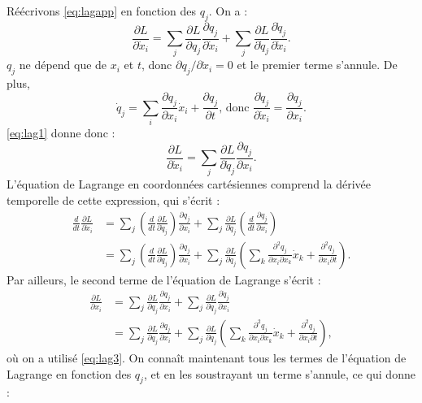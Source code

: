 Réécrivons \ref{eq:lagapp} en fonction des ${q_j}$. On a : 
\begin{equation}
\label{eq:lag1}
\frac{\partial L}{\partial \dot{x}_i} = \sum_j \frac{\partial L}{\partial q_j} \frac{\partial q_j}{\partial \dot{x}_i}+ \sum_j\frac{\partial L}{\partial \dot{q}_j}\frac{\partial \dot{q}_j}{\partial \dot{x}_i}.
\end{equation}
$q_j$ ne dépend que de $x_i$ et $t$, donc ${\partial q_j}/{\partial \dot{x}_i}=0$ et le premier terme s'annule. De plus,
\begin{equation}
\dot{q}_j = \sum_i \frac{\partial q_j}{\partial x_i}\dot{x}_i+\frac{\partial q_j}{\partial t}\text{,  donc  }
\frac{\partial \dot{q}_j}{\partial \dot{x}_i}=\frac{\partial q_j}{\partial x_i}.
\label{eq:lag3}
\end{equation}
\ref{eq:lag1} donne donc :
\begin{equation}
\label{eq:lag2}
\frac{\partial L}{\partial \dot{x}_i} = \sum_j\frac{\partial L}{\partial \dot{q}_j}\frac{\partial q_j}{\partial x_i}.
\end{equation}
L'équation de Lagrange en coordonnées cartésiennes comprend la dérivée temporelle de cette expression, qui s'écrit :
\begin{align}
\frac{d}{dt}\frac{\partial L}{\partial \dot{x}_i} &= 
\sum_j\left(\frac{d}{dt}\frac{\partial L}{\partial \dot{q}_j}\right)\frac{\partial q_j}{\partial x_i}+
\sum_j\frac{\partial L}{\partial \dot{q}_j}\left(\frac{d}{dt}\frac{\partial q_j}{\partial x_i}\right) \\
&=\sum_j \left(\frac{d}{dt}\frac{\partial L}{\partial \dot{q}_j}\right)\frac{\partial q_j}{\partial x_i}+\sum_j\frac{\partial L}{\partial \dot{q}_j}\left(\sum_k \frac{\partial^2q_j}{\partial x_i \partial x_k}\dot{x}_k + \frac{\partial^2q_j}{\partial x_i \partial t}\right).
\end{align}
Par ailleurs, le second terme de l'équation de Lagrange s'écrit :
\begin{align}
\frac{\partial L}{\partial x_i}&= \sum_j \frac{\partial L}{\partial q_j} \frac{\partial q_j}{\partial x_i}+ \sum_j\frac{\partial L}{\partial \dot{q}_j}\frac{\partial \dot{q}_j}{\partial x_i} \\
&=\sum_j \frac{\partial L}{\partial q_j} \frac{\partial q_j}{\partial x_i}+ \sum_j\frac{\partial L}{\partial \dot{q}_j}\left(\sum_k \frac{\partial^2q_j}{\partial x_i \partial x_k}\dot{x}_k + \frac{\partial^2q_j}{\partial x_i \partial t}\right),
\end{align}
où on a utilisé \ref{eq:lag3}. On connaît maintenant tous les termes de l'équation de Lagrange en fonction des ${q_j}$, et en les soustrayant un terme s'annule, ce qui donne :
